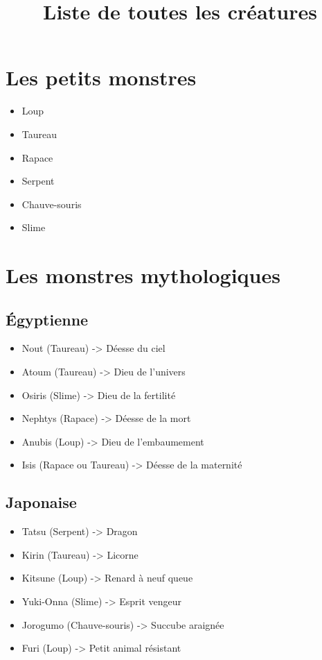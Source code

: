 \documentclass[12pt]{extarticle}
\title{Liste de toutes les créatures}
\author{}
\begin{document}
\maketitle{}

\section{Les petits monstres}

\begin{itemize}
\item Loup
\item Taureau
\item Rapace
\item Serpent
\item Chauve-souris
\item Slime
\end{itemize}

\section{Les monstres mythologiques}

\subsection{Égyptienne}

\begin{itemize}
\item Nout (Taureau) -> Déesse du ciel
\item Atoum (Taureau) -> Dieu de l'univers
\item Osiris (Slime) -> Dieu de la fertilité
\item Nephtys (Rapace) -> Déesse de la mort
\item Anubis (Loup) -> Dieu de l'embaumement
\item Isis (Rapace ou Taureau) -> Déesse de la maternité
\end{itemize}

\newpage

\subsection{Japonaise}

\begin{itemize}
\item Tatsu (Serpent) -> Dragon 
\item Kirin (Taureau) -> Licorne
\item Kitsune (Loup) -> Renard à neuf queue
\item Yuki-Onna (Slime) -> Esprit vengeur
\item Jorogumo (Chauve-souris) -> Succube araignée
\item Furi (Loup) -> Petit animal résistant
\end{itemize}
\end{document}

